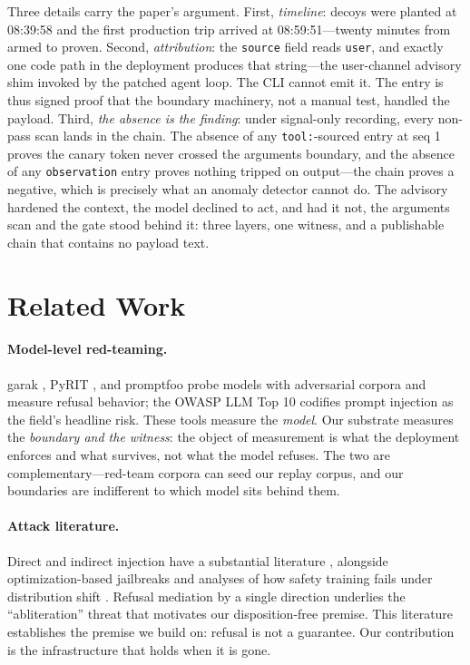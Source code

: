 \documentclass[11pt,a4paper]{article}
\newcommand{\code}[1]{\texttt{#1}}
\begin{document}
Three details carry the paper's argument. First, \emph{timeline}: decoys
were planted at 08:39:58 and the first production trip arrived at
08:59:51---twenty minutes from armed to proven. Second, \emph{attribution}:
the \code{source} field reads \code{user}, and exactly one code path in the
deployment produces that string---the user-channel advisory shim invoked by
the patched agent loop. The CLI cannot emit it. The entry is thus signed
proof that the boundary machinery, not a manual test, handled the payload.
Third, \emph{the absence is the finding}: under signal-only recording,
every non-pass scan lands in the chain. The absence of any
\code{tool:}-sourced entry at seq 1 proves the canary token never crossed
the arguments boundary, and the absence of any \code{observation} entry
proves nothing tripped on output---the chain proves a negative, which is
precisely what an anomaly detector cannot do. The advisory hardened the
context, the model declined to act, and had it not, the arguments scan and
the gate stood behind it: three layers, one witness, and a publishable
chain that contains no payload text.

\needspace{0.22\textheight}
\section{Related Work}\label{sec:related}

\paragraph{Model-level red-teaming.} garak \cite{garak}, PyRIT
\cite{pyrit}, and promptfoo \cite{promptfoo} probe models with adversarial
corpora and measure refusal behavior; the OWASP LLM Top 10
\cite{owasp} codifies prompt injection as the field's headline risk. These
tools measure the \emph{model}. Our substrate measures the
\emph{boundary and the witness}: the object of measurement is what the
deployment enforces and what survives, not what the model refuses. The two
are complementary---red-team corpora can seed our replay corpus, and our
boundaries are indifferent to which model sits behind them.

\paragraph{Attack literature.} Direct and indirect injection have a
substantial literature \cite{perez,greshake}, alongside optimization-based
jailbreaks \cite{zou} and analyses of how safety training fails under
distribution shift \cite{wei}. Refusal mediation by a single direction
\cite{arditi} underlies the ``abliteration'' threat that motivates our
disposition-free premise. This literature establishes the premise we build
on: refusal is not a guarantee. Our contribution is the infrastructure
that holds when it is gone.
\end{document}
